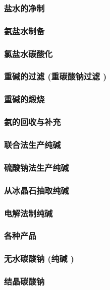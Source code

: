 \documentclass[UTF8]{../../ApplicationUniverse}
\begin{document}
                \subsubsection{盐水的净制}
                \subsubsection{氨盐水制备}
                \subsubsection{氯盐水碳酸化}
                \subsubsection{重碱的过滤 (重碳酸钠过滤 )}
                \subsubsection{重碱的煅烧}
                \subsubsection{氨的回收与补充}
            \subsubsection{联合法生产纯碱}
            \subsubsection{硫酸钠法生产纯碱}
            \subsubsection{从冰晶石抽取纯碱}
            \subsubsection{电解法制纯碱}
        \subsubsection{各种产品}
            \subsubsection{无水碳酸钠 (纯碱 )}
            \subsubsection{结晶碳酸钠}
\end{document}

